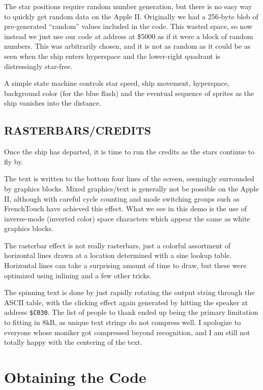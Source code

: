 \documentclass[twocolumn]{article}
\begin{document}
The star positions require random number generation, but there is no
easy way to quickly get random data on the Apple II.
Originally we had a 256-byte blob of pre-generated ``random'' values
included in the code.
This wasted space, so now instead we just use our code at address
at \$5000 as if it were a block of random numbers.
This was arbitrarily chosen, and it is not as random as it could be
as seen when the ship enters hyperspace and the lower-right quadrant
is distressingly star-free.

A simple state machine controls star speed, ship movement, hyperspace,
background color (for the blue flash) and the eventual sequence of sprites
as the ship vanishes into the distance.

\subsection{RASTERBARS/CREDITS}

Once the ship has departed, it is time to run the credits as the stars
continue to fly by.

The text is written to the bottom four lines of the screen, seemingly
surrounded by graphics blocks.
Mixed graphics/text is generally not be possible on the Apple II, although
with careful cycle counting and mode switching groups such as FrenchTouch
have achieved this effect.
What we see in this demo is the use of inverse-mode (inverted color)
space characters which appear the same as white graphics blocks.

The rasterbar effect is not really rasterbars, just a colorful assortment
of horizontal lines drawn at a location determined with a sine lookup table.
Horizontal lines can take a surprising amount of time to draw, but these
were optimized using inlining and a few other tricks.

The spinning text is done by just rapidly rotating the output string through
the ASCII table, with the clicking effect again generated
by hitting the speaker at address {\tt \$C030}.
The list of people to thank ended up being the primary limitation to
fitting in 8kB, as unique text strings do not compress well.  
I apologize to everyone whose moniker got compressed beyond recognition,
and I am still not totally happy with the centering of the text.

\section{Obtaining the Code}
\end{document}
